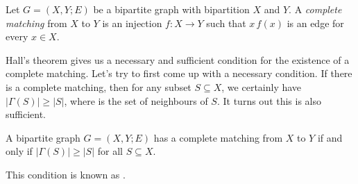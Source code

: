 \documentclass[a4paper]{article}
\begin{document}
\begin{defi}
  Let $G = (X, Y; E)$ be a bipartite graph with bipartition $X$ and $Y$. A \emph{complete matching} from $X$ to $Y$ is an injection $f: X \to Y$ such that $x\, f(x)$ is an edge for every $x \in X$.
\end{defi}

Hall's theorem gives us a necessary and sufficient condition for the existence of a complete matching. Let's try to first come up with a necessary condition. If there is a complete matching, then for any subset $S \subseteq X$, we certainly have $|\Gamma(S)| \geq |S|$, where  is the set of neighbours of $S$. It turns out this is also sufficient.

\begin{thm}[Hall, 1935]
  A bipartite graph $G = (X, Y; E)$ has a complete matching from $X$ to $Y$ if and only if $|\Gamma(S)| \geq |S|$ for all $S \subseteq X$.
\end{thm}
This condition is known as .
\end{document}
